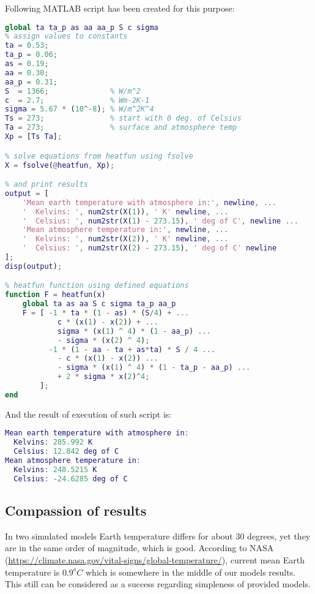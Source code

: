 \documentclass[onecolumn]{article}
\begin{document}
\begin{enumerate}
      Following MATLAB script has been created for this purpose:
      \begin{lstlisting}[language=Matlab,frame=single,label={lst:autocorr},breaklines=true,caption={Mean Earth temperature with atmosphere calculation script}]
% declare constants as globals so heatfun function can use it
global ta ta_p as aa aa_p S c sigma
% assign values to constants
ta = 0.53;       
ta_p = 0.06;
as = 0.19;
aa = 0.30;
aa_p = 0.31;
S  = 1366;              % W/m^2
c  = 2.7;               % Wm-2K-1
sigma = 5.67 * (10^-8); % W/m^2K^4
Ts = 273;               % start with 0 deg. of Celsius
Ta = 273;               % surface and atmosphere temp
Xp = [Ts Ta];

% solve equations from heatfun using fsolve 
X = fsolve(@heatfun, Xp);

% and print results
output = [
    'Mean earth temperature with atmosphere in:', newline, ...
    '  Kelvins: ', num2str(X(1)), ' K' newline, ...
    '  Celsius: ', num2str(X(1) - 273.15), ' deg of C', newline ...
    'Mean atmosphere temperature in:', newline, ...
    '  Kelvins: ', num2str(X(2)), ' K' newline, ...
    '  Celsius: ', num2str(X(2) - 273.15), ' deg of C' newline
];
disp(output);

% heatfun function using defined equations
function F = heatfun(x)
    global ta as aa S c sigma ta_p aa_p
    F = [ -1 * ta * (1 - as) * (S/4) + ...
            c * (x(1) - x(2)) + ...
            sigma * (x(1) ^ 4) * (1 - aa_p) ...
            - sigma * (x(2) ^ 4);
          -1 * (1 - aa - ta + as*ta) * S / 4 ...
            - c * (x(1) - x(2)) ...
            - sigma * (x(1) ^ 4) * (1 - ta_p - aa_p) ...
            + 2 * sigma * x(2)^4;
        ];
end
      \end{lstlisting}
      \newpage
	  And the result of execution of such script is:
      \begin{lstlisting}[language=Matlab,frame=single,label={lst:autocorr},breaklines=true,caption={Mean Earth temperature with atmosphere calculation script execution}]
Mean earth temperature with atmosphere in:
  Kelvins: 285.992 K
  Celsius: 12.842 deg of C
Mean atmosphere temperature in:
  Kelvins: 248.5215 K
  Celsius: -24.6285 deg of C
      \end{lstlisting}
\end{enumerate}
\subsection{Compassion of results}
In two simulated models Earth temperature differs for about 30 degrees, yet they are in the same order of magnitude, which is good. According to NASA (\url{https://climate.nasa.gov/vital-signs/global-temperature/}), current mean Earth temperature is $0.9^{o}C$ which is somewhere in the middle of our models results. This still can be considered as a success regarding simpleness of provided models.
\end{document}
